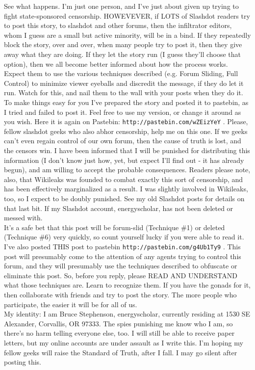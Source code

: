 \documentclass[11pt,twoside,a4paper]{article}
\begin{document}
See what happens. I'm just one person, and I've just about given up trying to fight state-sponsored censorship. HOWEVEVER, if LOTS of Slashdot readers try to post this story, to slashdot and other forums, then the infiltrator editors, whom I guess are a small but active minority, will be in a bind. If they repeatedly block the story, over and over, when many people try to post it, then they give away what they are doing. If they let the story run (I guess they'll choose that option), then we all become better informed about how the process works. Expect them to use the various techniques described (e.g. Forum Sliding, Full Control) to minimize viewer eyeballs and discredit the message, if they do let it run. Watch for this, and nail them to the wall with your posts when they do it.~\\

To make things easy for you I've prepared the story and posted it to pastebin, as I tried and failed to post it. Feel free to use my version, or change it around as you wish. Here it is again on Pastebin: \texttt{http://pastebin.com/wZEizYeY} . Please, fellow slashdot geeks who also abhor censorship, help me on this one. If we geeks can't even regain control of our own forum, then the cause of truth is lost, and the censors win. I have been informed that I will be punished for distributing this information (I don't know just how, yet, but expect I'll find out - it has already begun), and am willing to accept the probable consequences. Readers please note, also, that Wikileaks was founded to combat exactly this sort of censorship, and has been effectively marginalized as a result. I was slightly involved in Wikileaks, too, so I expect to be doubly punished. See my old Slashdot posts for details on that last bit. If my Slashdot account, energyscholar, has not been deleted or messed with.~\\

It's a safe bet that this post will be forum-slid (Technique \#1) or deleted (Technique \#6) very quickly, so count yourself lucky if you were able to read it. I've also posted THIS post to pastebin \texttt{http://pastebin.com/g4Ub1Ty9} . This post will presumably come to the attention of any agents trying to control this forum, and they will presumably use the techniques described to obfuscate or eliminate this post. So, before you reply, please READ AND UNDERSTAND what those techniques are. Learn to recognize them. If you have the gonads for it, then collaborate with friends and try to post the story. The more people who participate, the easier it will be for all of us.~\\

My identity: I am Bruce Stephenson, energyscholar, currently residing at 1530 SE Alexander, Corvallis, OR 97333. The spies punishing me know who I am, so there's no harm telling everyone else, too. I will still be able to receive paper letters, but my online accounts are under assault as I write this. I'm hoping my fellow geeks will raise the Standard of Truth, after I fall. I may go silent after posting this.

\clearpage
\end{document}
